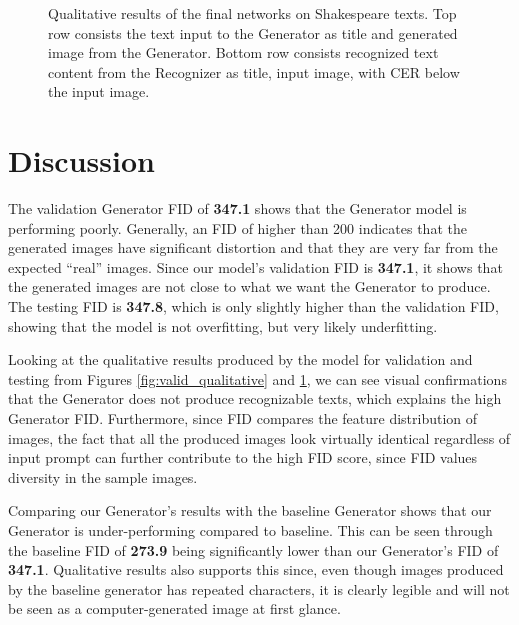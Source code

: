 \documentclass{article} %
\begin{document}
\begin{figure}[!hbpt]
    \begin{center}
        
    \end{center}
    \caption{Qualitative results of the final networks on Shakespeare texts. Top row consists the text input to the Generator as title and generated image from the Generator. Bottom row consists recognized text content from the Recognizer as title, input image, with CER below the input image.}
    \label{fig:test_qualitative}
\end{figure}

\section{Discussion}
\label{sec:discussion}
The validation Generator FID of \textbf{347.1} shows that the Generator model is performing poorly. Generally, an FID of higher than 200 indicates that the generated images have significant distortion and that they are very far from the expected ``real'' images. Since our model's validation FID is \textbf{347.1}, it shows that the generated images are not close to what we want the Generator to produce. The testing FID is \textbf{347.8}, which is only slightly higher than the validation FID, showing that the model is not overfitting, but very likely underfitting.

Looking at the qualitative results produced by the model for validation and testing from Figures \ref{fig:valid_qualitative} and \ref{fig:test_qualitative}, we can see visual confirmations that the Generator does not produce recognizable texts, which explains the high Generator FID. Furthermore, since FID compares the feature distribution of images, the fact that all the produced images look virtually identical regardless of input prompt can further contribute to the high FID score, since FID values diversity in the sample images.

Comparing our Generator's results with the baseline Generator shows that our Generator is under-performing compared to baseline. This can be seen through the baseline FID of \textbf{273.9} being significantly lower than our Generator's FID of \textbf{347.1}. Qualitative results also supports this since, even though images produced by the baseline generator has repeated characters, it is clearly legible and will not be seen as a computer-generated image at first glance.
\end{document}
